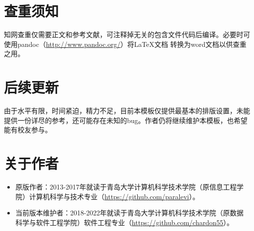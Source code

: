 \section{查重须知}
知网查重仅需要正文和参考文献，可注释掉无关的包含文件代码后编译。必要时可使用pandoc（\url{http://www.pandoc.org/}）将\LaTeX 文档 转换为word文档以供查重之用。

\section{后续更新}
由于水平有限，时间紧迫，精力不足，目前本模板仅提供最基本的排版设置，未能提供一份详尽的参考，还可能存在未知的bug。作者仍将继续维护本模板，也希望能有校友参与。

\section{关于作者}
\begin{itemize}
    \item 原版作者：2013-2017年就读于青岛大学计算机科学技术学院（原信息工程学院）计算机科学与技术专业（\url{https://github.com/paralevi}）。
    \item 当前版本维护者：2018-2022年就读于青岛大学计算机科学技术学院（原数据科学与软件工程学院）软件工程专业（\url{https://github.com/chardon55}）。
\end{itemize}
